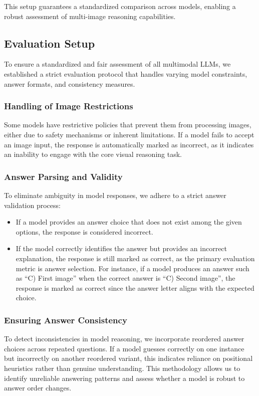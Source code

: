 This setup guarantees a standardized comparison across models, enabling a robust assessment of multi-image reasoning capabilities.


\subsection{Evaluation Setup}

To ensure a standardized and fair assessment of all multimodal LLMs, we established a strict evaluation protocol that handles varying model constraints, answer formats, and consistency measures.




\subsubsection{Handling of Image Restrictions} 
Some models have restrictive policies that prevent them from processing images, either due to safety mechanisms or inherent limitations. If a model fails to accept an image input, the response is automatically marked as incorrect, as it indicates an inability to engage with the core visual reasoning task.

\subsubsection{Answer Parsing and Validity} 
To eliminate ambiguity in model responses, we adhere to a strict answer validation process:
\begin{itemize}
    \item If a model provides an answer choice that does not exist among the given options, the response is considered incorrect.
    \item If the model correctly identifies the answer but provides an incorrect explanation, the response is still marked as correct, as the primary evaluation metric is answer selection. For instance, if a model produces an answer such as “C) First image” when the correct answer is “C) Second image”, the response is marked as correct since the answer letter aligns with the expected choice.
\end{itemize}

\subsubsection{Ensuring Answer Consistency} 
To detect inconsistencies in model reasoning, we incorporate reordered answer choices across repeated questions. If a model guesses correctly on one instance but incorrectly on another reordered variant, this indicates reliance on positional heuristics rather than genuine understanding. This methodology allows us to identify unreliable answering patterns and assess whether a model is robust to answer order changes.

